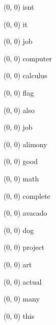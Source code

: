 \documentclass[11pt]{letter} %
\begin{document}
\begin{textblock}{0}(0, 0) \tiny{isnt} \end{textblock}
\begin{textblock}{0}(0, 0) \tiny{it} \end{textblock}
\begin{textblock}{0}(0, 0) \tiny{job} \end{textblock}
\begin{textblock}{0}(0, 0) \scriptsize{computer} \end{textblock}
\begin{textblock}{0}(0, 0) \scriptsize{calculus} \end{textblock}
\begin{textblock}{0}(0, 0) \scriptsize{flag} \end{textblock}
\begin{textblock}{0}(0, 0) \footnotesize{also} \end{textblock}
\begin{textblock}{0}(0, 0) \footnotesize{job} \end{textblock}
\begin{textblock}{0}(0, 0) \footnotesize{alimony} \end{textblock}
\begin{textblock}{0}(0, 0) \small{good} \end{textblock}
\begin{textblock}{0}(0, 0) \small{math} \end{textblock}
\begin{textblock}{0}(0, 0) \small{complete} \end{textblock}
\begin{textblock}{0}(0, 0) \normalsize{avacado} \end{textblock}
\begin{textblock}{0}(0, 0) \normalsize{dog} \end{textblock}
\begin{textblock}{0}(0, 0) \normalsize{project} \end{textblock}
\begin{textblock}{0}(0, 0) \large{art} \end{textblock}
\begin{textblock}{0}(0, 0) \large{actual} \end{textblock}
\begin{textblock}{0}(0, 0) \large{many} \end{textblock}
\begin{textblock}{0}(0, 0) \Large{this} \end{textblock}
\end{document}

